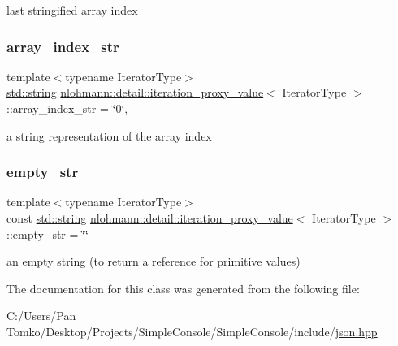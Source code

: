 last stringified array index 

\mbox{\label{classnlohmann_1_1detail_1_1iteration__proxy__value_a434324f7bed312c5b4aaedd3c6664e28}} 
\subsubsection{\texorpdfstring{array\_index\_str}{array\_index\_str}}
{\footnotesize\ttfamily template$<$typename Iterator\+Type$>$ \\
\mbox{\hyperlink{namespacenlohmann_1_1detail_a1ed8fc6239da25abcaf681d30ace4985ab45cffe084dd3d20d928bee85e7b0f21}{std\+::string}} \mbox{\hyperlink{classnlohmann_1_1detail_1_1iteration__proxy__value}{nlohmann\+::detail\+::iteration\+\_\+proxy\+\_\+value}}$<$ Iterator\+Type $>$\+::array\+\_\+index\+\_\+str = \char`\"{}0\char`\"{}\hspace{0.3cm}{\ttfamily [mutable]}, {\ttfamily [private]}}



a string representation of the array index 

\mbox{\label{classnlohmann_1_1detail_1_1iteration__proxy__value_af970916a35c40e75e2317a6a08370324}} 
\subsubsection{\texorpdfstring{empty\_str}{empty\_str}}
{\footnotesize\ttfamily template$<$typename Iterator\+Type$>$ \\
const \mbox{\hyperlink{namespacenlohmann_1_1detail_a1ed8fc6239da25abcaf681d30ace4985ab45cffe084dd3d20d928bee85e7b0f21}{std\+::string}} \mbox{\hyperlink{classnlohmann_1_1detail_1_1iteration__proxy__value}{nlohmann\+::detail\+::iteration\+\_\+proxy\+\_\+value}}$<$ Iterator\+Type $>$\+::empty\+\_\+str = \char`\"{}\char`\"{}\hspace{0.3cm}{\ttfamily [private]}}



an empty string (to return a reference for primitive values) 



The documentation for this class was generated from the following file\+:\begin{DoxyCompactItemize}
\item 
C\+:/\+Users/\+Pan Tomko/\+Desktop/\+Projects/\+Simple\+Console/\+Simple\+Console/include/\mbox{\hyperlink{json_8hpp}{json.\+hpp}}\end{DoxyCompactItemize}
